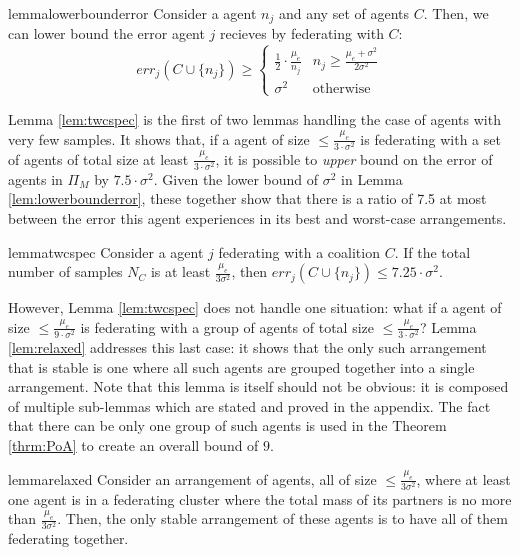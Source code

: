 \documentclass{article}
\newcommand{\cd}[0]{\cdot}
\newcommand{\mue}[0]{\ensuremath{\mu_e}}
\newcommand{\var}[0]{\ensuremath{\sigma^2}}
\newcommand{\ndraw}[0]{\ensuremath{n}}
\newcommand{\total}[0]{\ensuremath{N}}
\newcommand{\col}[0]{\ensuremath{C}}
\newcommand{\partition}[0]{\ensuremath{\Pi}}
\begin{document}
\begin{restatable}{lemma}{lowerbounderror}
\label{lem:lowerbounderror}
Consider a agent $\ndraw_j$ and any set of agents $\col$. Then, we can lower bound the error agent $j$ recieves by federating with $\col$: 
\begin{equation*}
err_{j}(\col\cup\{\ndraw_j\})\geq \begin{cases}
 \frac{1}{2} \cd\frac{\mue}{\ndraw_j} & \ndraw_j \geq \frac{\mue +\var}{2\var}\\
 \var & \text{otherwise}
\end{cases}
\end{equation*}
\end{restatable}

Lemma \ref{lem:twcspec} is the first of two lemmas handling the case of agents with very few samples. It shows that, if a agent of size $\leq \frac{\mue}{3\cd \var}$ is federating with a set of agents of total size at least $\frac{\mue}{3\cd \var}$, it is possible to \emph{upper} bound on the error of agents in $\partition_M$ by $7.5\cd \var$. Given the lower bound of $\var$ in Lemma \ref{lem:lowerbounderror}, these together show that there is a ratio of 7.5 at most between the error this agent experiences in its best and worst-case arrangements. 

\begin{restatable}{lemma}{twcspec}
\label{lem:twcspec}
Consider a agent $j$ federating with a coalition $\col$. If the total number of samples $\total_{\col}$ is at least $\frac{\mue}{3\var}$, then $err_j(\col \cup \{\ndraw_j\}) \leq 7.25 \cd \var$. 
\end{restatable}

However, Lemma \ref{lem:twcspec} does not handle one situation: what if a agent of size $\leq \frac{\mue}{9\cd \var}$ is federating with a group of agents of total size $\leq \frac{\mue}{3\cd \var}$? Lemma \ref{lem:relaxed} addresses this last case: it shows that the only such arrangement that is stable is one where all such agents are grouped together into a single arrangement. Note that this lemma is itself should not be obvious: it is composed of multiple sub-lemmas which are stated and proved in the appendix. The fact that there can be only one group of such agents is used in the Theorem \ref{thrm:PoA} to create an overall bound of $9$. 
\begin{restatable}{lemma}{relaxed}
\label{lem:relaxed}
Consider an arrangement of agents, all of size $\leq \frac{\mue}{3\var}$, where at least one agent is in a federating cluster where the total mass of its partners is no more than $\frac{\mue}{3\var}$. Then, the only stable arrangement of these agents is to have all of them federating together. 
\end{restatable}
\end{document}
